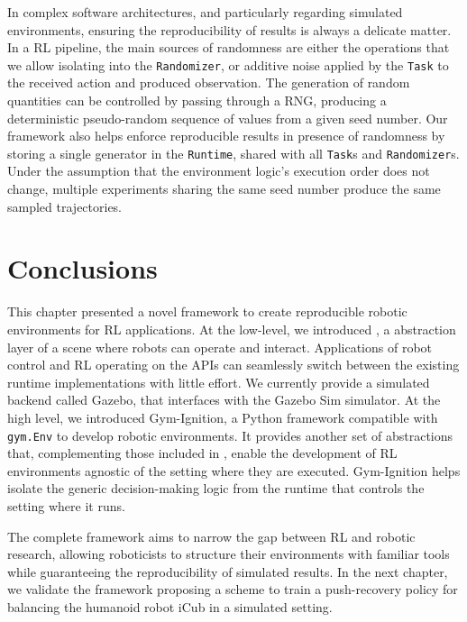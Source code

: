 In complex software architectures, and particularly regarding simulated environments, ensuring the reproducibility of results is always a delicate matter.
In a \ac{RL} pipeline, the main sources of randomness are either the operations that we allow isolating into the \verb|Randomizer|, or additive noise applied by the \verb|Task| to the received action and produced observation.
The generation of random quantities can be controlled by passing through a \ac{RNG}, producing a deterministic pseudo-random sequence of values from a given seed number.
Our framework also helps enforce reproducible results in presence of randomness by storing a single generator in the \verb|Runtime|, shared with all \verb|Task|s and \verb|Randomizer|s.
Under the assumption that the environment logic's execution order does not change, multiple experiments sharing the same seed number produce the same sampled trajectories.

\newpage
\section{Conclusions}

This chapter presented a novel framework to create reproducible robotic environments for \acl{RL} applications.
At the low-level, we introduced \scenario, a \cpp abstraction layer of a scene where robots can operate and interact.
Applications of robot control and \ac{RL} operating on the \scenario \acp{API} can seamlessly switch between the existing runtime implementations with little effort.
We currently provide a simulated backend called \scenario Gazebo, that interfaces with the Gazebo Sim simulator.
At the high level, we introduced Gym-Ignition, a Python framework compatible with \verb|gym.Env| to develop robotic environments.
It provides another set of abstractions that, complementing those included in \scenario, enable the development of \ac{RL} environments agnostic of the setting where they are executed.
Gym-Ignition helps isolate the generic decision-making logic from the runtime that controls the setting where it runs.

The complete framework aims to narrow the gap between \ac{RL} and robotic research, allowing roboticists to structure their environments with familiar tools while guaranteeing the reproducibility of simulated results.
In the next chapter, we validate the framework proposing a scheme to train a push-recovery policy  for balancing the humanoid robot iCub in a simulated setting.
